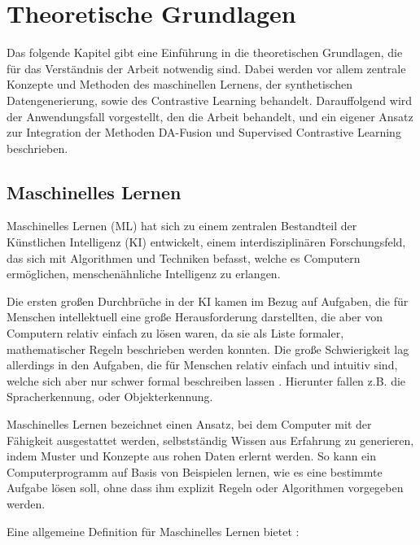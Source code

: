\chapter{Theoretische Grundlagen} \label{ch:theory}

Das folgende Kapitel gibt eine Einführung in die theoretischen Grundlagen, die für das Verständnis der Arbeit notwendig sind. Dabei werden vor allem zentrale Konzepte und Methoden des maschinellen Lernens, der synthetischen Datengenerierung, sowie des Contrastive Learning behandelt. Darauffolgend wird der Anwendungsfall vorgestellt, den die Arbeit behandelt, und ein eigener Ansatz zur Integration der Methoden DA-Fusion und Supervised Contrastive Learning beschrieben.

\section{Maschinelles Lernen} \label{sec:ml}

Maschinelles Lernen (ML) hat sich zu einem zentralen Bestandteil der Künstlichen Intelligenz (KI) entwickelt, einem interdisziplinären Forschungsfeld, das sich mit Algorithmen und Techniken befasst, welche es Computern ermöglichen, menschenähnliche Intelligenz zu erlangen.

Die ersten großen Durchbrüche in der KI kamen im Bezug auf Aufgaben, die für Menschen intellektuell eine große Herausforderung darstellten, die aber von Computern relativ einfach zu lösen waren, da sie als Liste formaler, mathematischer Regeln beschrieben werden konnten. Die große Schwierigkeit lag allerdings in den Aufgaben, die für Menschen relativ einfach und intuitiv sind, welche sich aber nur schwer formal beschreiben lassen \parencite{Goodfellow2016deeplearning}. Hierunter fallen z.B. die Spracherkennung, oder Objekterkennung.

Maschinelles Lernen bezeichnet einen Ansatz, bei dem Computer mit der Fähigkeit ausgestattet werden, selbstständig Wissen aus Erfahrung zu generieren, indem Muster und Konzepte aus rohen Daten erlernt werden. So kann ein Computerprogramm auf Basis von Beispielen lernen, wie es eine bestimmte Aufgabe lösen soll, ohne dass ihm explizit Regeln oder Algorithmen vorgegeben werden.

Eine allgemeine Definition für Maschinelles Lernen bietet \parencite{Mitchell1997machinelearning}:

